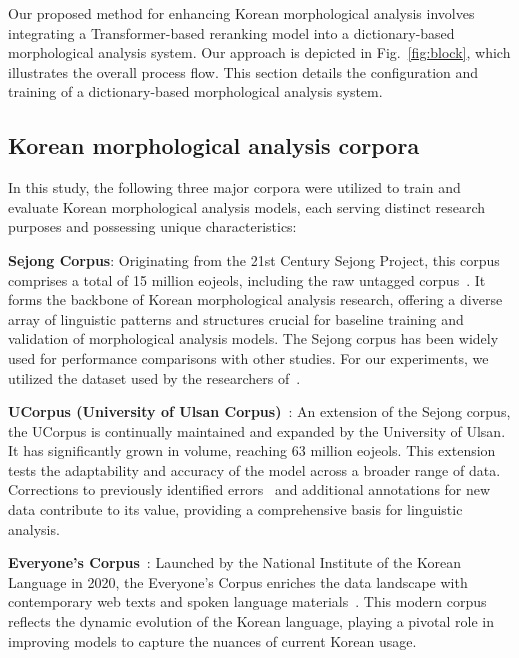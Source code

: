 \documentclass[AMS,STIX2COL]{WileyNJD-v2}
\begin{document}
    Our proposed method for enhancing Korean morphological analysis involves integrating a Transformer-based reranking model into a dictionary-based morphological analysis system.
    Our approach is depicted in Fig.~\ref{fig:block}, which illustrates the overall process flow.
    This section details the configuration and training of a dictionary-based morphological analysis system.

    \subsection{Korean morphological analysis corpora}\label{subsec:korean-morphological-analysis-corpora}

    In this study, the following three major corpora were utilized to train and evaluate Korean morphological analysis models, each serving distinct research purposes and possessing unique characteristics:

    \textbf{Sejong Corpus}: Originating from the 21st Century Sejong Project, this corpus comprises a total of 15 million eojeols, including the raw untagged corpus~\cite{ChoeMW2008}.
    It forms the backbone of Korean morphological analysis research, offering a diverse array of linguistic patterns and structures crucial for baseline training and validation of morphological analysis models.
    The Sejong corpus has been widely used for performance comparisons with other studies.
    For our experiments, we utilized the dataset used by the researchers of~\cite{MinJW2019, MinJW2020, MinJW2022, MinJW2018, NaSH2015, NaSH2014, NaSH2018, SongHJ2019, SongHJ2020}.

    \textbf{UCorpus (University of Ulsan Corpus)}~\cite{UCorpusHG}: An extension of the Sejong corpus, the UCorpus is continually maintained and expanded by the University of Ulsan.
    It has significantly grown in volume, reaching 63 million eojeols.
    This extension tests the adaptability and accuracy of the model across a broader range of data.
    Corrections to previously identified errors~\cite{KimIH2010} and additional annotations for new data contribute to its value, providing a comprehensive basis for linguistic analysis.

    \textbf{Everyone's Corpus}~\cite{EveryoneCorpus}: Launched by the National Institute of the Korean Language in 2020, the Everyone's Corpus enriches the data landscape with contemporary web texts and spoken language materials~\cite{KimIH2019}.
    This modern corpus reflects the dynamic evolution of the Korean language, playing a pivotal role in improving models to capture the nuances of current Korean usage.
\end{document}
